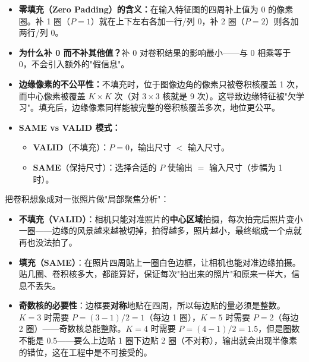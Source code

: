 \documentclass[a4paper,11pt]{ctexart}
\begin{document}
\begin{beginnerbox}
    \begin{itemize}
        \item \textbf{零填充（Zero Padding）的含义：}在输入特征图的四周补上值为 0 的像素圈。补 1 圈（$P=1$）就在上下左右各加一行/列 0，补 2 圈（$P=2$）则各加两行/列 0。
        \item \textbf{为什么补 0 而不补其他值？}补 0 对卷积结果的影响最小——与 0 相乘等于 0，不会引入额外的"假信息"。
        \item \textbf{边缘像素的不公平性：}不填充时，位于图像边角的像素只被卷积核覆盖 1 次，而中心像素被覆盖 $K \times K$ 次（对 $3 \times 3$ 核就是 9 次）。这导致边缘特征被"欠学习"。填充后，边缘像素同样能被完整的卷积核覆盖多次，地位更公平。
        \item \textbf{SAME vs VALID 模式：}
            \begin{itemize}
                \item \textbf{VALID}（不填充）：$P=0$，输出尺寸 $< $ 输入尺寸。
                \item \textbf{SAME}（保持尺寸）：选择合适的 $P$ 使输出 $=$ 输入尺寸（步幅为 1 时）。
            \end{itemize}
    \end{itemize}
\end{beginnerbox}

\begin{metaphorbox}
    把卷积想象成对一张照片做"局部聚焦分析"：

    \begin{itemize}
        \item \textbf{不填充（VALID）}：相机只能对准照片的\textbf{中心区域}拍摄，每次拍完后照片变小一圈——边缘的风景越来越被切掉，拍得越多，照片越小，最终缩成一个点就再也没法拍了。
        \item \textbf{填充（SAME）}：在照片四周贴上一圈白色边框，让相机也能对准边缘拍摄。贴几圈、卷积核多大，都能算好，保证每次"拍出来的照片"和原来一样大，信息不丢失。
        \item \textbf{奇数核的必要性}：边框要\textbf{对称}地贴在四周，所以每边贴的量必须是整数。$K=3$ 时需要 $P=(3-1)/2=1$（每边 1 圈），$K=5$ 时需要 $P=2$（每边 2 圈）——奇数核总能整除。$K=4$ 时需要 $P=(4-1)/2=1.5$，但是圈数不能是 0.5——要么上边贴 1 圈下边贴 2 圈（不对称），输出就会出现半像素的错位，这在工程中是不可接受的。
    \end{itemize}
\end{metaphorbox}
\end{document}
